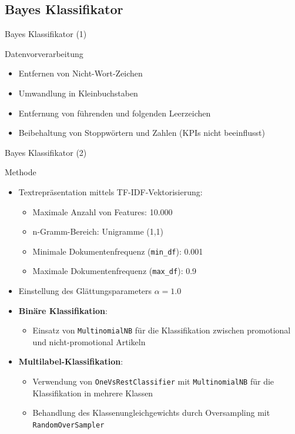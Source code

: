 \documentclass[aspectratio=169]{beamer} %
\begin{document}
\subsection{Bayes Klassifikator}

\begin{frame}{Bayes Klassifikator (1)}
    \begin{block}{Datenvorverarbeitung}
        \begin{itemize}
            \item Entfernen von Nicht-Wort-Zeichen
            \item Umwandlung in Kleinbuchstaben
            \item Entfernung von f\"uhrenden und folgenden Leerzeichen
            \item Beibehaltung von Stoppw\"ortern und Zahlen (KPIs nicht beeinflusst)
        \end{itemize}
    \end{block}
\end{frame}
\begin{frame}{Bayes Klassifikator (2)}
    \begin{block}{Methode}
        \begin{itemize}
            \item Textrepr\"asentation mittels TF-IDF-Vektorisierung:
                  \begin{itemize}
                      \item Maximale Anzahl von Features: 10.000
                      \item n-Gramm-Bereich: Unigramme (1,1)
                      \item Minimale Dokumentenfrequenz (\texttt{min\_df}): 0.001
                      \item Maximale Dokumentenfrequenz (\texttt{max\_df}): 0.9
                  \end{itemize}
            \item Einstellung des Gl\"attungsparameters \(\alpha = 1.0\)
            \item \textbf{Bin\"are Klassifikation}:
                  \begin{itemize}
                      \item Einsatz von \texttt{MultinomialNB} f\"ur die Klassifikation zwischen promotional und nicht-promotional Artikeln
                  \end{itemize}
            \item \textbf{Multilabel-Klassifikation}:
                  \begin{itemize}
                      \item Verwendung von \texttt{OneVsRestClassifier} mit \texttt{MultinomialNB} f\"ur die Klassifikation in mehrere Klassen
                      \item Behandlung des Klassenungleichgewichts durch Oversampling mit \texttt{RandomOverSampler}
                  \end{itemize}
        \end{itemize}
    \end{block}
\end{frame}
\end{document}
